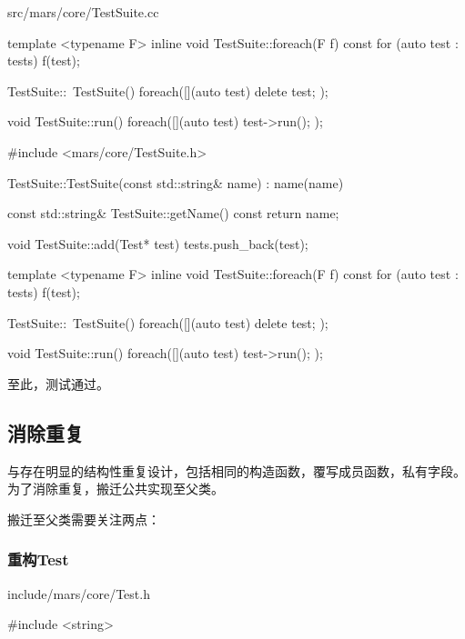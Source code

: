\begin{content}
\begin{diff}{src/mars/core/TestSuite.cc}
\begin{minicpp}
template <typename F>
inline void TestSuite::foreach(F f) const {
  for (auto test : tests) {
    f(test);
  }
}

TestSuite::~TestSuite() {
  foreach([](auto test) {
    delete test;
  });
}

void TestSuite::run() {
  foreach([](auto test) {
    test->run();
  });
}
 \end{minicpp}
\tcblower
 \begin{minicpp}
#include <mars/core/TestSuite.h>

TestSuite::TestSuite(const std::string& name)
  : name(name) {
}

const std::string& TestSuite::getName() const {
  return name;
}

void TestSuite::add(Test* test) {
  tests.push_back(test);
}

template <typename F>
inline void TestSuite::foreach(F f) const {
  for (auto test : tests) {
    f(test);
  }
}

TestSuite::~TestSuite() {
  foreach([](auto test) {
    delete test;
  });
}

void TestSuite::run() {
  foreach([](auto test) {
    test->run();
  });
}
 \end{minicpp}
\end{diff}

至此，测试通过。

\subsection{消除重复}

与存在明显的结构性重复设计，包括相同的构造函数，覆写成员函数，私有字段。为了消除重复，搬迁公共实现至父类。

搬迁至父类需要关注两点：

\begin{enum}
\end{enum}

\subsubsection{重构Test}

\begin{diff}{include/mars/core/Test.h}
 \begin{minicpp}
#include <string>


\end{minicpp}
\end{diff}
\end{content}
